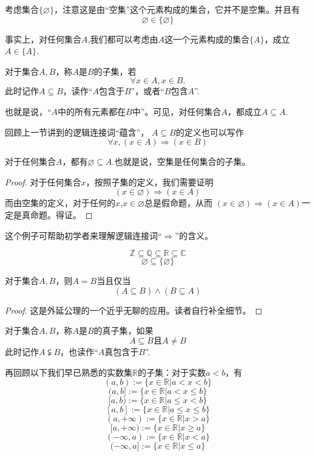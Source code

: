 \begin{example}
考虑集合$\{\varnothing\}$，注意这是由“空集”这个元素构成的集合，它并不是空集。并且有
$$\varnothing\in\{\varnothing\}$$
\end{example}

事实上，对任何集合$A$,我们都可以考虑由$A$这一个元素构成的集合$\{A\}$，成立$A\in\{A\}$.

\begin{definition}[子集]
对于集合$A,B$，称$A$是$B$的子集，若
$$\forall x\in A, x\in B.$$
此时记作$A\subseteq B$，读作“$A$包含于$B$”，或者“$B$包含$A$”.
\end{definition}
也就是说，“$A$中的所有元素都在$B$中”。可见，对任何集合$A$，都成立$A\subseteq A$.

回顾上一节讲到的逻辑连接词“蕴含”，
$A\subseteq B$的定义也可以写作
$$\forall x, (x\in A)\Rightarrow(x\in B)$$

\begin{prop}
对于任何集合$A$，都有$\varnothing\subseteq A$.也就是说，空集是任何集合的子集。
\end{prop}
\begin{proof}
对于任何集合$x$，按照子集的定义，我们需要证明
$$(x\in\varnothing)\Rightarrow(x\in A)$$
而由空集的定义，对于任何的$x$,$x\in\varnothing$总是假命题，从而
$(x\in\varnothing)\Rightarrow(x\in A)$一定是真命题。得证。
\end{proof}
这个例子可帮助初学者来理解逻辑连接词“$\Rightarrow$”的含义。

\begin{example}
$$\mathbb{Z}\subseteq\mathbb{Q}\subseteq\mathbb{R}\subseteq\mathbb{C}$$
$$\varnothing\subseteq\{\varnothing\}$$
\end{example}

\begin{prop}[集合相等的一个充要条件]
对于集合$A,B$，则$A=B$当且仅当
$$(A\subseteq B)\wedge(B\subseteq A)$$
\end{prop}
\begin{proof}
这是外延公理的一个近乎无聊的应用。读者自行补全细节。
\end{proof}

\begin{definition}[真子集]
对于集合$A,B$，称$A$是$B$的真子集，如果
$$A\subseteq B\text{且}A\neq B$$
此时记作$A\subsetneqq B$，也读作“$A$真包含于$B$”.
\end{definition}

\begin{example}[开区间与闭区间]
再回顾以下我们早已熟悉的实数集$\mathbb{R}$的子集：对于实数$a<b$，有
$$(a,b):=\{x\in\mathbb{R}|a<x<b\}$$
$$(a,b]:=\{x\in\mathbb{R}|a<x\leq b\}$$
$$[a,b):=\{x\in\mathbb{R}|a\leq x<b\}$$
$$[a,b]:=\{x\in\mathbb{R}|a\leq x\leq b\}$$
$$(a,+\infty):=\{x\in\mathbb{R}|x>a\}$$
$$[a,+\infty):=\{x\in\mathbb{R}|x\geq a\}$$
$$(-\infty,a):=\{x\in\mathbb{R}|x<a\}$$
$$(-\infty,a]:=\{x\in\mathbb{R}|x\leq a\}$$
\end{example}

